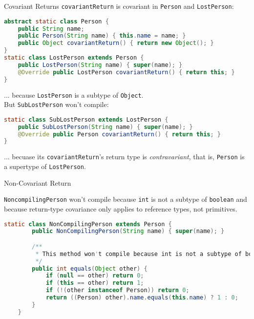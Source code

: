 \documentclass{beamer}
\begin{document}
\begin{frame}[fragile]{Covariant Returns}
\vspace{-.05in}
{\tt covariantReturn} is covariant in {\tt Person} and {\tt LostPerson}:
\vspace{-.05in}
\begin{lstlisting}[language=Java]
abstract static class Person {
    public String name;
    public Person(String name) { this.name = name; }
    public Object covariantReturn() { return new Object(); }
}
static class LostPerson extends Person {
    public LostPerson(String name) { super(name); }
    @Override public LostPerson covariantReturn() { return this; }
}
\end{lstlisting}
... because {\tt LostPerson} is a subtype of {\tt Object}.\\
But {\tt SubLostPerson} won't compile:
\vspace{-.05in}
\begin{lstlisting}[language=Java]
static class SubLostPerson extends LostPerson {
    public SubLostPerson(String name) { super(name); }
    @Override public Person covariantReturn() { return this; }
}
\end{lstlisting}
... becuase its {\tt covariantReturn}'s return type is {\it contravariant}, that is, {\tt Person} is a supertype of {\tt LostPerson}.
\end{frame}


\begin{frame}[fragile]{Non-Covariant Return}

{\tt NoncompilingPerson} won't compile because {\tt int} is not a subtype of {\tt boolean} and because return-type covariance only applies to reference types, not primitives.
\begin{lstlisting}[language=Java]
    static class NonCompilingPerson extends Person {
        public NonCompilingPerson(String name) { super(name); }

        /**
         * This method won't compile because int is not a subtype of boolean.
         */
        public int equals(Object other) {
            if (null == other) return 0;
            if (this == other) return 1;
            if (!(other instanceof Person)) return 0;
            return ((Person) other).name.equals(this.name) ? 1 : 0;
        }
    }

\end{lstlisting}


\end{frame}
\end{document}

